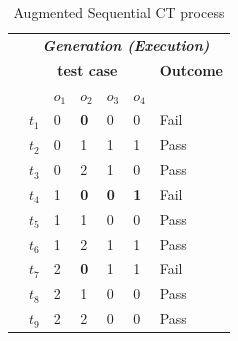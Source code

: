 \documentclass[journal,12pt,onecolumn,draftclsnofoot,]{IEEEtran}
\begin{document}
\begin{table}[ht]
\caption{Augmented Sequential CT process}
\label{tradition-gi-aug}
\centering
\begin{tabular}{lllllll}
                                       & \multicolumn{6}{c}{\bfseries \emph{Generation (Execution)}}                                                                                                                                                                                                                                  \\ \cline{2-7}
                                       & \multicolumn{5}{c|}{\bfseries test case}                                                                                                                                                                                                              & \bfseries Outcome \\
                                       & &$o_{1}$ & $o_{2}$& $o_{3}$& \multicolumn{1}{c|}{$o_{4}$}&  \\    \cline{2-7}
                                       & \multicolumn{1}{l|}{$t_{1}$}   & 0& \textbf{0}& 0& \multicolumn{1}{l|}{0}     & Fail              \\
                                       & \multicolumn{1}{l|}{$t_{2}$}   & 0& 1& 1& \multicolumn{1}{l|}{1}     & Pass              \\
                                       & \multicolumn{1}{l|}{$t_{3}$}   & 0& 2& 1& \multicolumn{1}{l|}{0}     & Pass              \\
                                       & \multicolumn{1}{l|}{$t_{4}$}   & 1& \textbf{0}& \textbf{0}& \multicolumn{1}{l|}{\textbf{1}}     & Fail              \\
                                       & \multicolumn{1}{l|}{$t_{5}$}   & 1& 1& 0& \multicolumn{1}{l|}{0}     & Pass              \\
                                       & \multicolumn{1}{l|}{$t_{6}$}   & 1& 2& 1& \multicolumn{1}{l|}{1}     & Pass              \\
                                       & \multicolumn{1}{l|}{$t_{7}$}   & 2& \textbf{0}& 1& \multicolumn{1}{l|}{1}     & Fail              \\
                                       & \multicolumn{1}{l|}{$t_{8}$}   & 2& 1& 0& \multicolumn{1}{l|}{0}     & Pass              \\
                                       & \multicolumn{1}{l|}{$t_{9}$}   & 2& 2& 0& \multicolumn{1}{l|}{0}     & Pass              \\ \cline{2-7}

\end{tabular}
\end{table}
\end{document}
